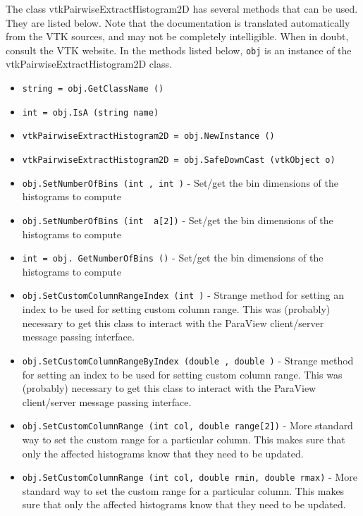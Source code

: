 The class vtkPairwiseExtractHistogram2D has several methods that can be used.
  They are listed below.
Note that the documentation is translated automatically from the VTK sources,
and may not be completely intelligible.  When in doubt, consult the VTK website.
In the methods listed below, \verb|obj| is an instance of the vtkPairwiseExtractHistogram2D class.
\begin{itemize}
\item  \verb|string = obj.GetClassName ()|

\item  \verb|int = obj.IsA (string name)|

\item  \verb|vtkPairwiseExtractHistogram2D = obj.NewInstance ()|

\item  \verb|vtkPairwiseExtractHistogram2D = obj.SafeDownCast (vtkObject o)|

\item  \verb|obj.SetNumberOfBins (int , int )| -  Set/get the bin dimensions of the histograms to compute

\item  \verb|obj.SetNumberOfBins (int  a[2])| -  Set/get the bin dimensions of the histograms to compute

\item  \verb|int = obj. GetNumberOfBins ()| -  Set/get the bin dimensions of the histograms to compute

\item  \verb|obj.SetCustomColumnRangeIndex (int )| -  Strange method for setting an index to be used for setting custom 
 column range. This was (probably) necessary to get this class
 to interact with the ParaView client/server message passing interface.

\item  \verb|obj.SetCustomColumnRangeByIndex (double , double )| -  Strange method for setting an index to be used for setting custom 
 column range. This was (probably) necessary to get this class
 to interact with the ParaView client/server message passing interface.

\item  \verb|obj.SetCustomColumnRange (int col, double range[2])| -  More standard way to set the custom range for a particular column.
 This makes sure that only the affected histograms know that they
 need to be updated.

\item  \verb|obj.SetCustomColumnRange (int col, double rmin, double rmax)| -  More standard way to set the custom range for a particular column.
 This makes sure that only the affected histograms know that they
 need to be updated.


\end{itemize}
